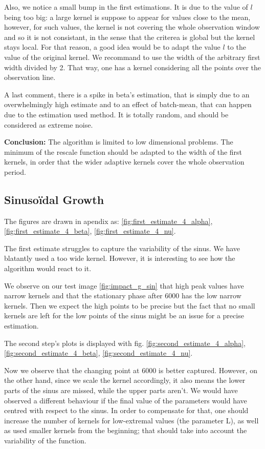 \documentclass[11pt]{book}
\begin{document}
Also, we notice a small bump in the first estimations. It is due to the value of $l$ being too big: a large kernel is suppose to appear for values close to the mean, however, for such values, the kernel is not covering the whole observation window and so it is not consistant, in the sense that the criterea is global but the kernel stays local. For that reason, a good idea would be to adapt the value $l$ to the value of the original kernel. We recommand to use the width of the arbitrary first width divided by 2. That way, one has a kernel considering all the points over the observation line.

A last comment, there is a spike in beta's estimation, that is simply due to an overwhelmingly high estimate and to an effect of batch-mean, that can happen due to the estimation used method. It is totally random, and should be considered as extreme noise.

\textbf{Conclusion:} The algorithm is limited to low dimensional problems. The minimum of the rescale function should be adapted to the width of the first kernels, in order that the wider adaptive kernels cover the whole observation period.

\subsection{Sinusoïdal Growth}
The figures are drawn in apendix as: \ref{fig:first_estimate_4_alpha}, \ref{fig:first_estimate_4_beta}, \ref{fig:first_estimate_4_nu}.

The first estimate struggles to capture the variability of the sinus. We have blatantly used a too wide kernel. However, it is interesting to see how the algorithm would react to it.

We observe on our test image \ref{fig:impact_g_sin} that high peak values have narrow kernels and that the stationary phase after 6000 has the low narrow kernels. Then we expect the high points to be precise but the fact that no small kernels are left for the low points of the sinus might be an issue for a precise estimation.

The second step's plots is displayed with fig. \ref{fig:second_estimate_4_alpha}, \ref{fig:second_estimate_4_beta}, \ref{fig:second_estimate_4_nu}.

Now we observe that the changing point at 6000 is better captured. However, on the other hand, since we scale the kernel accordingly, it also means the lower parts of the sinus are missed, while the upper parts aren't. We would have observed a different behaviour if the final value of the parameters would have centred with respect to the sinus. In order to compensate for that, one should increase the number of kernels for low-extremal values (the parameter 	L), as well as used smaller kernels from the beginning; that should take into account the variability of the function.
\end{document}
